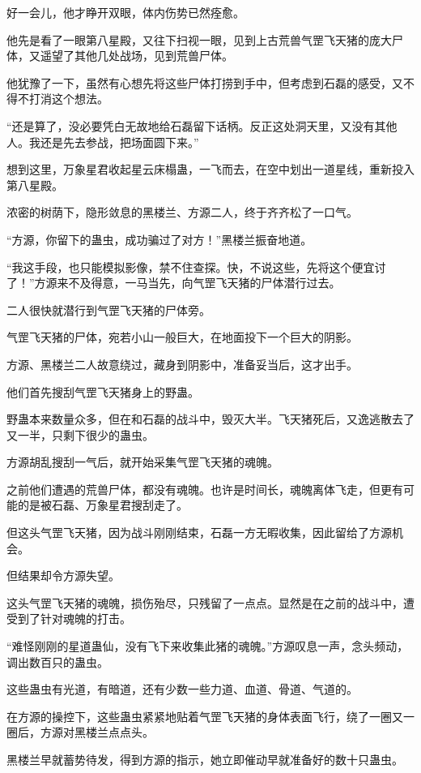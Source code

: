 \begin{this_body}
好一会儿，他才睁开双眼，体内伤势已然痊愈。

他先是看了一眼第八星殿，又往下扫视一眼，见到上古荒兽气罡飞天猪的庞大尸体，又遥望了其他几处战场，见到荒兽尸体。

他犹豫了一下，虽然有心想先将这些尸体打捞到手中，但考虑到石磊的感受，又不得不打消这个想法。

“还是算了，没必要凭白无故地给石磊留下话柄。反正这处洞天里，又没有其他人。我还是先去参战，把场面圆下来。”

想到这里，万象星君收起星云床榻蛊，一飞而去，在空中划出一道星线，重新投入第八星殿。

浓密的树荫下，隐形敛息的黑楼兰、方源二人，终于齐齐松了一口气。

“方源，你留下的蛊虫，成功骗过了对方！”黑楼兰振奋地道。

“我这手段，也只能模拟影像，禁不住查探。快，不说这些，先将这个便宜讨了！”方源来不及得意，一马当先，向气罡飞天猪的尸体潜行过去。

二人很快就潜行到气罡飞天猪的尸体旁。

气罡飞天猪的尸体，宛若小山一般巨大，在地面投下一个巨大的阴影。

方源、黑楼兰二人故意绕过，藏身到阴影中，准备妥当后，这才出手。

他们首先搜刮气罡飞天猪身上的野蛊。

野蛊本来数量众多，但在和石磊的战斗中，毁灭大半。飞天猪死后，又逸逃散去了又一半，只剩下很少的蛊虫。

方源胡乱搜刮一气后，就开始采集气罡飞天猪的魂魄。

之前他们遭遇的荒兽尸体，都没有魂魄。也许是时间长，魂魄离体飞走，但更有可能的是被石磊、万象星君搜刮走了。

但这头气罡飞天猪，因为战斗刚刚结束，石磊一方无暇收集，因此留给了方源机会。

但结果却令方源失望。

这头气罡飞天猪的魂魄，损伤殆尽，只残留了一点点。显然是在之前的战斗中，遭受到了针对魂魄的打击。

“难怪刚刚的星道蛊仙，没有飞下来收集此猪的魂魄。”方源叹息一声，念头频动，调出数百只的蛊虫。

这些蛊虫有光道，有暗道，还有少数一些力道、血道、骨道、气道的。

在方源的操控下，这些蛊虫紧紧地贴着气罡飞天猪的身体表面飞行，绕了一圈又一圈后，方源对黑楼兰点点头。

黑楼兰早就蓄势待发，得到方源的指示，她立即催动早就准备好的数十只蛊虫。


\end{this_body}
